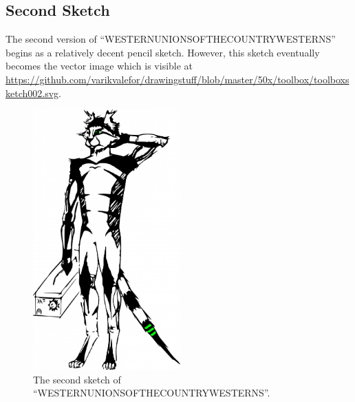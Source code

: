 \documentclass{report}
\newcommand\imageheight{10cm}
\begin{document}
\subsection{Second Sketch}
The second version of ``WESTERNUNIONSOFTHECOUNTRYWESTERNS'' begins as a relatively decent pencil sketch.  However, this sketch eventually becomes the vector image which is visible at \url{https://github.com/varikvalefor/drawingstuff/blob/master/50x/toolbox/toolboxsketch002.svg}.
\begin{figure}[ht]
	\centering
	\includegraphics[height=\imageheight]{50x/toolbox/s1v2.jpg}
	\caption[center]{The second sketch of ``WESTERNUNIONSOFTHECOUNTRYWESTERNS''.}
\end{figure}
\end{document}
